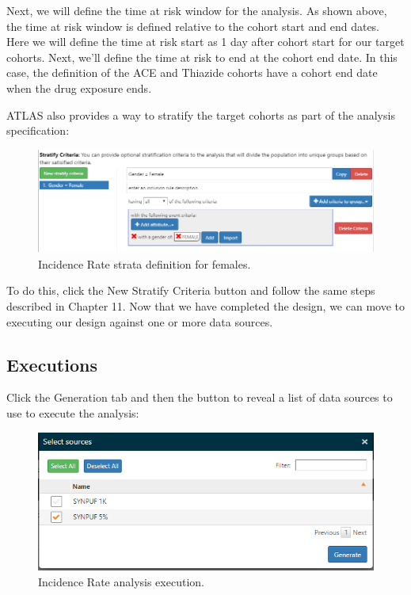\documentclass[11pt]{book}
\theoremstyle{definition}
\theoremstyle{definition}
\theoremstyle{definition}
\theoremstyle{remark}
\begin{document}
Next, we will define the time at risk window for the analysis. As shown above, the time at risk window is defined relative to the cohort start and end dates. Here we will define the time at risk start as 1 day after cohort start for our target cohorts. Next, we'll define the time at risk to end at the cohort end date. In this case, the definition of the ACE and Thiazide cohorts have a cohort end date when the drug exposure ends.

ATLAS also provides a way to stratify the target cohorts as part of the analysis specification:

\begin{figure}

{\centering \includegraphics[width=1\linewidth]{images/Characterization/atlasIncidenceStratifyFemale} 

}

\caption{Incidence Rate strata definition for females.}\label{fig:atlasIncidenceStratifyFemale}
\end{figure}

To do this, click the New Stratify Criteria button and follow the same steps described in Chapter 11. Now that we have completed the design, we can move to executing our design against one or more data sources.

\hypertarget{executions-2}{%
\subsection{Executions}\label{executions-2}}

Click the Generation tab and then the button to reveal a list of data sources to use to execute the analysis:

\begin{figure}

{\centering \includegraphics[width=1\linewidth]{images/Characterization/atlasIncidenceSourceSelection} 

}

\caption{Incidence Rate analysis execution.}\label{fig:atlasIncidenceSourceSelection}
\end{figure}
\end{document}
